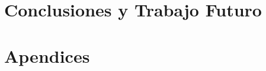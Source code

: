 \documentclass[11pt,a4paper,spanish]{book}
\numberwithin{equation}{chapter}
\numberwithin{figure}{chapter}
\begin{document}
\chapter{Conclusiones y Trabajo Futuro}

%
%
%
%
%
%
%




\appendix
\chapter{Apendices}
\end{document}
